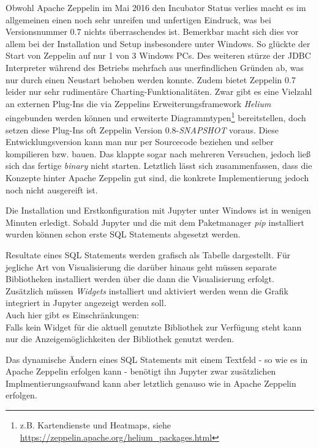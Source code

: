 Obwohl Apache Zeppelin im Mai 2016 den Incubator Status verlies macht es im allgemeinen einen noch sehr unreifen und unfertigen Eindruck,
was bei Versionsnummer 0.7 nichts überraschendes ist.
Bemerkbar macht sich dies vor allem bei der Installation und Setup insbesondere unter Windows.
So glückte der Start von Zeppelin auf nur 1 von 3 Windows PCs.
Des weiteren stürze der JDBC Interpreter während des Betriebs mehrfach aus unerfindlichen Gründen ab, was nur durch einen Neustart behoben werden konnte.
Zudem bietet Zeppelin 0.7 leider nur sehr rudimentäre Charting-Funktionalitäten.
Zwar gibt es eine Vielzahl an externen Plug-Ins die via Zeppelins Erweiterungsframework \textit{Helium} eingebunden werden können und erweiterte Diagrammtypen\footnote{z.B. Kartendienste und  Heatmaps, siehe \href{https://zeppelin.apache.org/helium_packages.html}{https://zeppelin.apache.org/helium\_packages.html} } bereitstellen, doch setzen diese Plug-Ins oft Zeppelin Version 0.8-\textit{SNAPSHOT} voraus. Diese Entwicklungsversion kann man nur per Sourcecode beziehen und selber kompilieren bzw. bauen.
Das klappte sogar nach mehreren Versuchen, jedoch ließ sich das fertige \textit{binary} nicht starten.\newline
Letztlich lässt sich zusammenfassen, dass die Konzepte hinter Apache Zeppelin gut sind, die konkrete Implementierung jedoch noch nicht ausgereift ist.

Die Installation und Erstkonfiguration mit Jupyter unter Windows ist in wenigen Minuten erledigt.
Sobald Jupyter und die  mit dem Paketmanager \textit{pip} installiert wurden können
schon erste \ac{SQL} Statements abgesetzt werden.

Resultate eines \ac{SQL} Statements werden grafisch als Tabelle dargestellt.
Für jegliche Art von Visualisierung die darüber hinaus geht müssen separate Bibliotheken installiert werden
über die dann die Visualisierung erfolgt.
Zusätzlich müssen \textit{Widgets} installiert und aktiviert werden wenn die Grafik integriert in Jupyter angezeigt werden soll.\\
Auch hier gibt es Einschränkungen:\\
Falls kein Widget für die aktuell genutzte Bibliothek zur Verfügung steht kann nur die Anzeigemöglichkeiten der Bibliothek genutzt werden.

Das dynamische Ändern eines \ac{SQL} Statements mit einem Textfeld - so wie es in Apache Zeppelin erfolgen kann - benötigt ihn Jupyter zwar zusätzlichen Implmentierungsaufwand kann aber letztlich genauso wie in Apache Zeppelin erfolgen.


